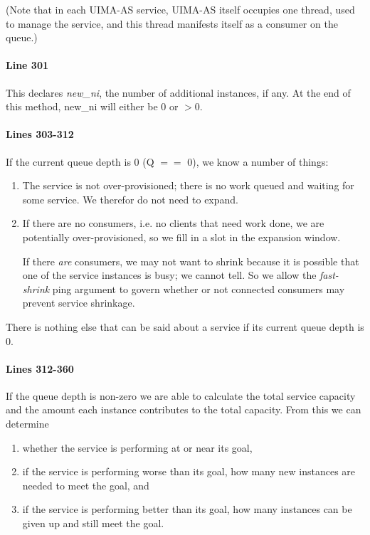     (Note that in each UIMA-AS service, UIMA-AS itself occupies one thread, used to
    manage the service, and this thread manifests itself as a consumer
    on the queue.)

    \paragraph{Line 301}
    This declares {\em new\_ni}, the number of additional instances, if any.
    At the end of this method, new\_ni will either be 0 or $>$0.

    \paragraph{Lines 303-312}
    If the current queue depth is 0 (Q $==$ 0), we know a number of things:
    \begin{enumerate}
      \item The service is not over-provisioned; there is no work queued and
        waiting for some service.  We therefor do not need to expand.
      \item If there are no consumers, i.e. no clients that need work done,
        we are potentially over-provisioned, so we fill in a slot in the
        expansion window.  
        
        If there {\em are} consumers, we may not want to
        shrink because it is possible that one of the service instances is
        busy; we cannot tell.  So we allow the {\em fast-shrink} 
        ping argument to govern whether or not connected consumers may
        prevent service shrinkage.
    \end{enumerate}

    There is nothing else that can be said about a service if its 
    current queue depth is 0.

    \paragraph{Lines 312-360}

    If the queue depth is non-zero we are able to calculate the total
    service capacity and the amount each instance contributes to the
    total capacity.  From this we can determine 
    \begin{enumerate}
      \item whether the service is performing at or near its goal, 
      \item if the service is performing worse than its goal, how many
        new instances are needed to meet the goal, and
      \item if the service is performing better than its goal, how many
        instances can be given up and still meet the goal.
   \end{enumerate}

